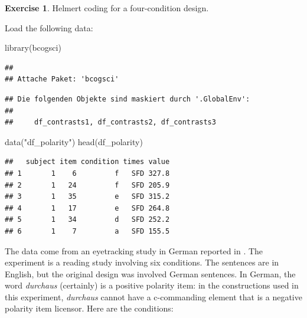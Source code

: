 \documentclass[
  12pt,
]{krantz}
\newenvironment{Shaded}{\begin{snugshade}}{\end{snugshade}}
\newcommand{\FunctionTok}[1]{\textcolor[rgb]{0.00,0.00,0.00}{#1}}
\newcommand{\NormalTok}[1]{#1}
\newcommand{\StringTok}[1]{\textcolor[rgb]{0.31,0.60,0.02}{#1}}
\theoremstyle{definition}
\theoremstyle{definition}
\theoremstyle{definition}
\newtheorem{exercise}{Exercise}[chapter]
\theoremstyle{definition}
\theoremstyle{remark}
\begin{document}
\begin{exercise}
\protect\hypertarget{exr:ContrastsNPIHelmert}{}\label{exr:ContrastsNPIHelmert}Helmert coding for a four-condition design.
\end{exercise}

Load the following data:

\begin{Shaded}
\begin{Highlighting}[]
\FunctionTok{library}\NormalTok{(bcogsci)}
\end{Highlighting}
\end{Shaded}

\begin{verbatim}
## 
## Attache Paket: 'bcogsci'
\end{verbatim}

\begin{verbatim}
## Die folgenden Objekte sind maskiert durch '.GlobalEnv':
## 
##     df_contrasts1, df_contrasts2, df_contrasts3
\end{verbatim}

\begin{Shaded}
\begin{Highlighting}[]
\FunctionTok{data}\NormalTok{(}\StringTok{"df\_polarity"}\NormalTok{)}
\FunctionTok{head}\NormalTok{(df\_polarity)}
\end{Highlighting}
\end{Shaded}

\begin{verbatim}
##   subject item condition times value
## 1       1    6         f   SFD 327.8
## 2       1   24         f   SFD 205.9
## 3       1   35         e   SFD 315.2
## 4       1   17         e   SFD 264.8
## 5       1   34         d   SFD 252.2
## 6       1    7         a   SFD 155.5
\end{verbatim}

The data come from an eyetracking study in German reported in \citet{VBLD07}. The experiment is a reading study involving six conditions. The sentences are in English, but the original design was involved German sentences. In German, the word \emph{durchaus} (certainly) is a positive polarity item: in the constructions used in this experiment, \emph{durchaus} cannot have a c-commanding element that is a negative polarity item licensor. Here are the conditions:
\end{document}
